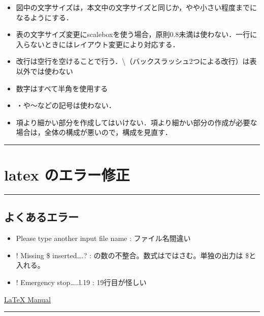 \begin{itemize}
\tightlist
\item
  図中の文字サイズは，本文中の文字サイズと同じか，やや小さい程度までになるようにする．
\item
  表の文字サイズ変更にscaleboxを使う場合，原則0.8未満は使わない．一行に入らないときにはレイアウト変更により対応する．
\item
  改行は空行を空けることで行う．\textbackslash{}（バックスラッシュ2つによる改行）は表以外では使わない
\item
  数字はすべて半角を使用する
\item
  ・や〜などの記号は使わない．
\item
  項より細かい部分を作成してはいけない．項より細かい部分の作成が必要な場合は，全体の構成が悪いので，構成を見直す．
\end{itemize}

\begin{center}\rule{0.5\linewidth}{\linethickness}\end{center}

\hypertarget{latex-ux306eux30a8ux30e9ux30fcux4feeux6b63}{\section{latex
のエラー修正}\label{latex-ux306eux30a8ux30e9ux30fcux4feeux6b63}}

\begin{center}\rule{0.5\linewidth}{\linethickness}\end{center}

\hypertarget{ux3088ux304fux3042ux308bux30a8ux30e9ux30fc}{\subsection{よくあるエラー}\label{ux3088ux304fux3042ux308bux30a8ux30e9ux30fc}}

\begin{itemize}
\item
  Please type another input file name : ファイル名間違い
\item
  ! Missing \$ inserted\ldots{}.? :
  \(の数の不整合。数式は\)\(ではさむ。単独の\)出力は \$と入れる。
\item
  ! Emergency stop\ldots{}..l.19 : 19行目が怪しい
\end{itemize}

\href{http://ribf.riken.jp/apr/guide-jp/LaTeX_Manual-jp.html}{LaTeX
Manual}

\begin{center}\rule{0.5\linewidth}{\linethickness}\end{center}

